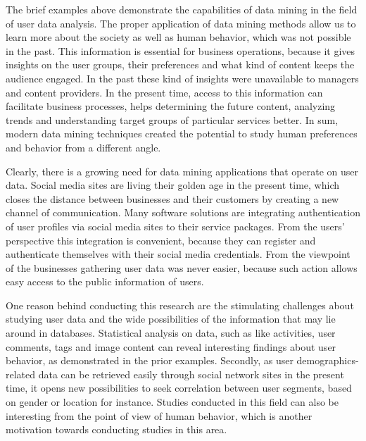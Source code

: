 
    The brief examples above demonstrate the capabilities of data mining in the field of user data analysis. The proper application of data mining methods allow us to learn more about the society as well as human behavior, which was not possible in the past. This information is essential for business operations, because it gives insights on the user groups, their preferences and what kind of content keeps the audience engaged. In the past these kind of insights were unavailable to managers and content providers. In the present time, access to this information can facilitate business processes, helps determining the future content, analyzing trends and understanding target groups of particular services better. In sum, modern data mining techniques created the potential to study human preferences and behavior from a different angle. 

    Clearly, there is a growing need for data mining applications that operate on user data. Social media sites are living their golden age in the present time, which closes the distance between businesses and their customers by creating a new channel of communication. Many software solutions are integrating authentication of user profiles via social media sites to their service packages. From the users' perspective this integration is convenient, because they can register and authenticate themselves with their social media credentials. From the viewpoint of the businesses gathering user data was never easier, because such action allows easy access to the public information of users. 

    One reason behind conducting this research are the stimulating challenges about studying user data and the wide possibilities of the information that may lie around in databases. Statistical analysis on data, such as like activities, user comments, tags and image content can reveal interesting findings about user behavior, as demonstrated in the prior examples. Secondly, as user demographics-related data can be retrieved easily through social network sites in the present time, it opens new possibilities to seek correlation between user segments, based on gender or location for instance. Studies conducted in this field can also be interesting from the point of view of human behavior, which is another motivation towards conducting studies in this area. 

